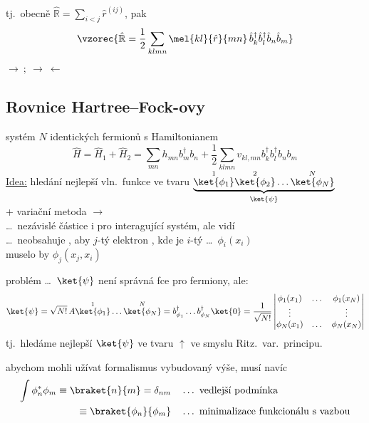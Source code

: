 \begin{veta}
tj.\ obecně \quad $\hat{\mathbb{R}} = \sum_{i<j}\hat r^{(ij)}$, \quad pak
\[
  \vzorec{\hat{\mathbb{R}} = \frac12\sum_{klmn}\mel{kl}{\hat r}{mn}\,\hat b_k^\dagger\hat b_l^\dagger\hat b_n\hat b_m}
\]
 \quad $\longrightarrow\ ;\ \longrightarrow\ \longleftarrow$ \quad {}
\end{veta}

\subsection*{Rovnice Hartree--Fock-ovy}
systém $N$ identických fermionů s Hamiltonianem
\[
  \hat H = \hat H_1 + \hat H_2 = \sum_{mn}h_{mn}b_m^\dagger b_n + \frac12\sum_{klmn}v_{kl,mn}b_k^\dagger b_l^\dagger b_nb_m
\]
\underline{Idea:} hledání nejlepší vln.\ funkce ve tvaru
$\underbrace{\overset{1}{\ket{\phi_1}}\overset{2}{\ket{\phi_2}}\dots\overset{N}{\ket{\phi_N}}}_{\ket{\psi}}$ \\
\quad + variační metoda \quad $\longrightarrow$ \  \\
\quad \dots\ nezávislé částice i pro interagující systém, ale vidí  \\
\quad \dots\ neobsahuje , aby $j$-tý elektron , kde je $i$-tý \dots\ $\phi_i(x_i)$ \\
\hspace*{9cm} muselo by $\phi_j(x_j,x_i)$

problém \dots\ $\ket{\psi}$ není správná fce pro fermiony, ale:
\[
  \ket{\psi} = \sqrt{N!}\,A\overset{1}{\ket{\phi_1}}\dots\overset{N}{\ket{\phi_N}} = b_{\phi_1}^\dagger\dots b_{\phi_N}^\dagger\ket{0}
  = \frac{1}{\sqrt{N!}}\begin{vmatrix}\phi_1(x_1) & \dots & \phi_1(x_N) \\ \vdots & & \vdots \\ \phi_N(x_1) & \dots & \phi_N(x_N)\end{vmatrix}
\]
tj.\ hledáme nejlepší $\ket{\psi}$ ve tvaru $\uparrow$ ve smyslu Ritz.\ var.\ principu.

abychom mohli užívat formalismus vybudovaný výše, musí navíc
\begin{align*}
  \int\phi_n^*\phi_m \equiv \braket{n}{m} = \delta_{nm} &\quad\dots\ \text{vedlejší podmínka} \\
  \equiv \braket{\phi_n}{\phi_m} &\quad\dots\ \text{minimalizace funkcionálu s vazbou}
\end{align*}

